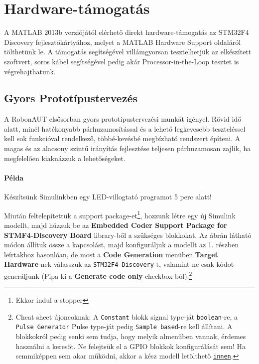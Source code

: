 \section{Hardware-támogatás}

A MATLAB 2013b verziójától elérhető direkt hardware-támogatás az STM32F4 Discovery fejlesztőkártyához, melyet a MATLAB Hardware Support oldaláról tölthetünk le. A támogatás segítségével villámgyorsan tesztelhetjük az elkészített szoftvert, soros kábel segítségével pedig akár Processor-in-the-Loop tesztet is végrehajthatunk.

\subsection{Gyors Prototípustervezés}

A RobonAUT elsősorban gyors prototípustervezési munkát igényel. Rövid idő alatt, minél hatékonyabb párhuzamosítással és a lehető legkevesebb teszteléssel kell sok funkcióval rendelkező, többé-kevésbé megbízható rendszert építeni. A magas és az alacsony szintű irányítás fejlesztése teljesen párhuzamosan zajlik, ha megfelelően kiaknázzuk a lehetőségeket.

\paragraph{Példa} Készítsünk Simulinkben egy LED-villogtató programot 5 perc alatt!

Miután feltelepítettük a support package-et\footnote{Ekkor indul a stopper}, hozzunk létre egy új Simulink modellt, majd húzzuk be az \textbf{Embedded Coder Support Package for STMF4-Discovery Board} library-ből a szükséges blokkokat. Az ábrán látható módon állítuk össze a kapcsolást, majd konfiguráljuk a modellt az 1. részben leírtakhoz hasonlóan, de most a \textbf{Code Generation} menüben \textbf{Target Hardware}-nek válasszuk az \verb!STM32F4-Discovery!-t, valamint ne csak kódot generáljunk (Pipa ki a \textbf{Generate code only} checkbox-ból).\footnote{Cheat sheet újoncoknak: A \texttt{Constant} blokk signal type-ját  \texttt{boolean}-re, a  \texttt{Pulse Generator} Pulse type-ját pedig  \texttt{Sample based}-re kell állítani. A blokkokról pedig senki sem tudja, hogy melyik almenüben vannak, érdemes használni a keresőt. Ne felejtsük el a GPIO blokkok konfigurálását sem! Ha semmiképpen sem akar működni, akkor a kész modell letölthető \href{http://www.mathworks.com/matlabcentral/fileexchange/45953-stm32f4-discovery-led-blinker}{\texttt{innen}}.}

